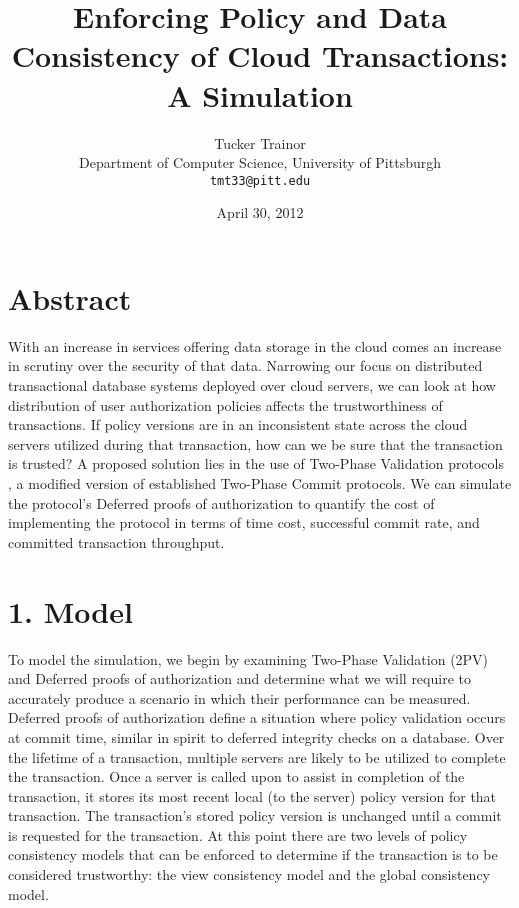 \documentclass[11pt]{article}
\title{Enforcing Policy and Data Consistency of Cloud Transactions: A Simulation}
\author{Tucker Trainor\\Department of Computer Science, University of Pittsburgh\\\texttt{tmt33@pitt.edu}}
\date{April 30, 2012} %
\begin{document}
\maketitle
\section{Abstract}
With an increase in services offering data storage in the cloud comes an increase in scrutiny over the security of that data. Narrowing our focus on distributed transactional database systems deployed over cloud servers, we can look at how distribution of user authorization policies affects the trustworthiness of transactions. If policy versions are in an inconsistent state across the cloud servers utilized during that transaction, how can we be sure that the transaction is trusted? A proposed solution lies in the use of Two-Phase Validation protocols \cite{Iskander}, a modified version of established Two-Phase Commit protocols. We can simulate the protocol's Deferred proofs of authorization to quantify the cost of implementing the protocol in terms of time cost, successful commit rate, and committed transaction throughput.
\section{1. Model}
To model the simulation, we begin by examining Two-Phase Validation (2PV) and Deferred proofs of authorization and determine what we will require to accurately produce a scenario in which their performance can be measured.
Deferred proofs of authorization define a situation where policy validation occurs at commit time, similar in spirit to deferred integrity checks on a database. Over the lifetime of a transaction, multiple servers are likely to be utilized to complete the transaction. Once a server is called upon to assist in completion of the transaction, it stores its most recent local (to the server) policy version for that transaction. The transaction's stored policy version is unchanged until a commit is requested for the transaction. At this point there are two levels of policy consistency models that can be enforced to determine if the transaction is to be considered trustworthy: the view consistency model and the global consistency model.
\end{document}
